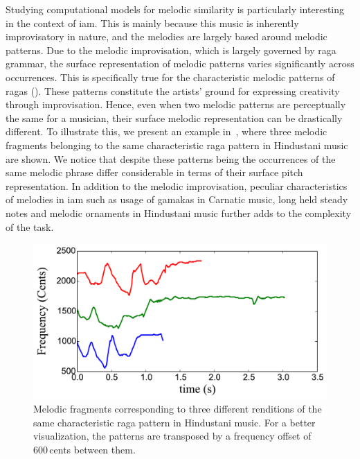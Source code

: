 Studying computational models for melodic similarity is particularly interesting in the context of \gls{iam}. This is mainly because this music is inherently improvisatory in nature, and the melodies are largely based around melodic patterns. Due to the melodic improvisation, which is largely governed by \gls{raga} grammar, the surface representation of melodic patterns varies significantly across occurrences. This is specifically true for the characteristic melodic patterns of \glspl{raga} (). These patterns constitute the artists' ground for expressing creativity through improvisation. Hence, even when two melodic patterns are perceptually the same for a musician, their surface melodic representation can be drastically different. To illustrate this, we present an example in~, where three melodic fragments belonging to the same characteristic \gls{raga} pattern in Hindustani music are shown. We notice that despite these patterns being the occurrences of the same melodic phrase differ considerable in terms of their surface pitch representation. In addition to the melodic improvisation, peculiar characteristics of melodies in \gls{iam} such as usage of \glspl{gamaka} in Carnatic music, long held steady notes and melodic ornaments in Hindustani music further adds to the complexity of the task.

\begin{figure}
	\begin{center}
		\includegraphics[width=\figSizeEighty]{ch06_patterns/figures/SimilarityEvaluation/Hindustani3Patts.pdf}
	\end{center}
	\caption{Melodic fragments corresponding to three different renditions of the same characteristic \gls{raga} pattern in Hindustani music. For a better visualization, the patterns are transposed by a frequency offset of 600\,cents between them.}
	\label{fig:examples_3_phrases}
\end{figure}

